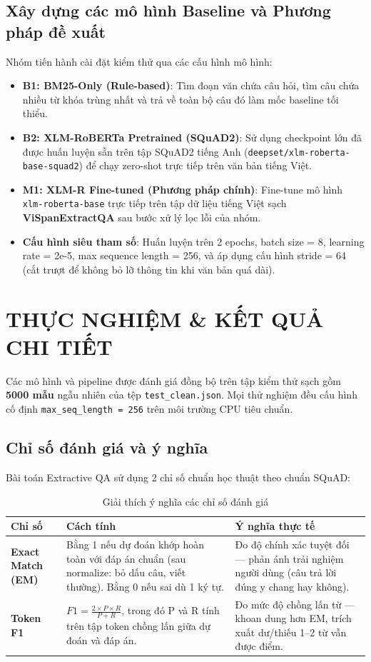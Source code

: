 \documentclass[12pt, a4paper]{article}
\begin{document}
\subsection{Xây dựng các mô hình Baseline và Phương pháp đề xuất}
Nhóm tiến hành cài đặt kiểm thử qua các cấu hình mô hình:
\begin{itemize}
    \item \textbf{B1: BM25-Only (Rule-based)}: Tìm đoạn văn chứa câu hỏi, tìm câu chứa nhiều từ khóa trùng nhất và trả về toàn bộ câu đó làm mốc baseline tối thiểu.
    \item \textbf{B2: XLM-RoBERTa Pretrained (SQuAD2)}: Sử dụng checkpoint lớn đã được huấn luyện sẵn trên tập SQuAD2 tiếng Anh (\texttt{deepset/xlm-roberta-base-squad2}) để chạy zero-shot trực tiếp trên văn bản tiếng Việt.
    \item \textbf{M1: XLM-R Fine-tuned (Phương pháp chính)}: Fine-tune mô hình \texttt{xlm-roberta-base} trực tiếp trên tập dữ liệu tiếng Việt sạch \textbf{ViSpanExtractQA} sau bước xử lý lọc lỗi của nhóm.
    \item \textbf{Cấu hình siêu tham số}: Huấn luyện trên 2 epochs, batch size = 8, learning rate = 2e-5, max sequence length = 256, và áp dụng cấu hình stride = 64 (cắt trượt để không bỏ lỡ thông tin khi văn bản quá dài).
\end{itemize}

\section{THỰC NGHIỆM \& KẾT QUẢ CHI TIẾT}
Các mô hình và pipeline được đánh giá đồng bộ trên tập kiểm thử sạch gồm \textbf{5000 mẫu} ngẫu nhiên của tệp \texttt{test\_clean.json}. Mọi thử nghiệm đều cấu hình cố định \texttt{max\_seq\_length = 256} trên môi trường CPU tiêu chuẩn.

\subsection{Chỉ số đánh giá và ý nghĩa}
Bài toán Extractive QA sử dụng 2 chỉ số chuẩn học thuật theo chuẩn SQuAD:

\begin{table}[H]
  \centering
  \small
  \caption{Giải thích ý nghĩa các chỉ số đánh giá}
  \begin{tabular}{lp{4.5cm}p{4.5cm}}
    \toprule
    \textbf{Chỉ số} & \textbf{Cách tính} & \textbf{Ý nghĩa thực tế} \\
    \midrule
    \textbf{Exact Match (EM)} & Bằng 1 nếu dự đoán khớp hoàn toàn với đáp án chuẩn (sau normalize: bỏ dấu câu, viết thường). Bằng 0 nếu sai dù 1 ký tự. & Đo độ chính xác tuyệt đối — phản ánh trải nghiệm người dùng (câu trả lời đúng y chang hay không). \\
    \textbf{Token F1} & $F1 = \frac{2 \times P \times R}{P+R}$, trong đó P và R tính trên tập token chồng lấn giữa dự đoán và đáp án. & Đo mức độ chồng lấn từ — khoan dung hơn EM, trích xuất dư/thiếu 1--2 từ vẫn được điểm. \\
    \bottomrule
  \end{tabular}
  \label{tab:chisodanhgia}
\end{table}
\end{document}
